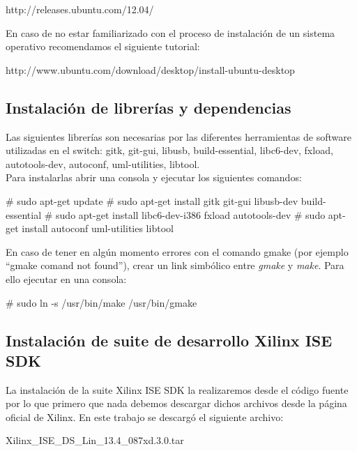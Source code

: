 \begin{center}
http://releases.ubuntu.com/12.04/
\end{center}  

En caso de no estar familiarizado con el proceso de instalación de un sistema operativo recomendamos el siguiente tutorial:

\begin{center}
http://www.ubuntu.com/download/desktop/install-ubuntu-desktop
\end{center}

\subsection{Instalación de librerías y dependencias}
Las siguientes librerías son necesarias por las diferentes herramientas de software utilizadas en el switch: gitk, git-gui, libusb, build-essential, libc6-dev, fxload, autotools-dev, autoconf, uml-utilities, libtool.\\

Para instalarlas abrir una consola y ejecutar los siguientes comandos:\\

\begin{bash}
# sudo apt-get update
# sudo apt-get install gitk git-gui libusb-dev build-essential 
# sudo apt-get install libc6-dev-i386 fxload autotools-dev
# sudo apt-get install autoconf uml-utilities libtool
\end{bash}

En caso de tener en algún momento errores con el comando gmake (por ejemplo “gmake comand not found”), crear un link simbólico entre \textit{gmake} y \textit{make}. Para ello ejecutar en una consola:\\

\begin{bash}
# sudo ln -s /usr/bin/make /usr/bin/gmake
\end{bash}

\subsection{Instalación de suite de desarrollo Xilinx ISE SDK}

La instalación de la suite Xilinx ISE SDK la realizaremos desde el código fuente por lo que primero que nada debemos descargar dichos archivos desde la página oficial de Xilinx. En este trabajo se descarg\'o el siguiente archivo:

\begin{center}
Xilinx\_ISE\_DS\_Lin\_13.4\_087xd.3.0.tar
\end{center}

